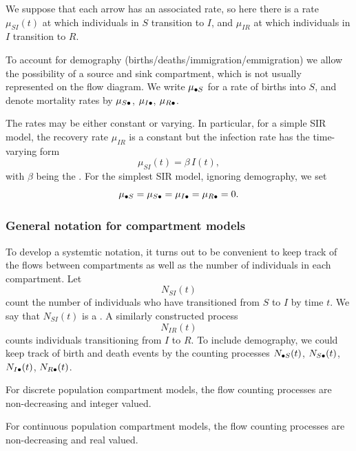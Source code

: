 \documentclass{beamer}\usepackage[]{graphicx}\usepackage[]{color}
\begin{document}
\begin{frame}[fragile]

\bi

\item We suppose that each arrow has an associated rate, so here there is a rate $\mu_{SI}(t)$ at which individuals in $S$ transition to $I$, and $\mu_{IR}$ at which individuals in $I$ transition to $R$. 

\item To account for demography (births/deaths/immigration/emmigration) we allow the possibility of a source and sink compartment, which is not usually represented on the flow diagram. We write $\mu_{{\small{\bullet}}S}$ for a rate of births into $S$, and denote mortality rates by $\mu_{S{\small\bullet}}$, $\mu_{I{\small\bullet}}$, $\mu_{R{\small\bullet}}$.

\item The rates may be either constant or varying. In particular, for a simple SIR model, the recovery rate $\mu_{IR}$ is a constant but the infection rate has the time-varying form
$$\mu_{SI}(t)=\beta \, I(t),$$
with $\beta$ being the . For the simplest SIR model, ignoring demography, we set
$$ \mu_{{\small{\bullet}}S}=\mu_{S{\small{\bullet}}}=\mu_{I{\small{\bullet}}}=\mu_{R{\small{\bullet}}}=0.$$

\ei

\end{frame}
\begin{frame}[fragile]
\frametitle{General notation for compartment models}
\bi
\item To develop a systemtic notation, it turns out to be convenient to keep track of the flows between compartments as well as the number of individuals in each compartment. Let
$$N_{SI}(t)$$
count the number of individuals who have transitioned from $S$ to $I$ by time $t$. We say that $N_{SI}(t)$ is a . A similarly constructed process
$$N_{IR}(t)$$
counts individuals transitioning from $I$ to $R$. To include demography, we could keep track of birth and death events by the counting processes $N_{{\small{\bullet}} S}(t)$, $N_{S{\small{\bullet}}}(t)$, $N_{I{\small{\bullet}}}(t)$, $N_{R{\small{\bullet}}}(t)$.

\item For discrete population compartment models, the flow counting processes are non-decreasing and integer valued.

\item For continuous population compartment models, the flow counting processes are non-decreasing and real valued.

\ei

\end{frame}
\end{document}
